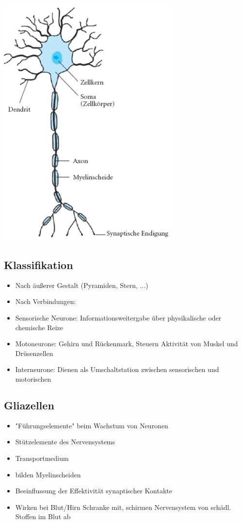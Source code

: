 \documentclass[a4paper,10pt,oneside]{article}
\begin{document}
\includegraphics[scale=0.65]{Grafiken/neuron.png}


\subsection{Klassifikation}
\begin{itemize}
	\item Nach äußerer Gestalt (Pyramiden, Stern, ...)
	\item Nach Verbindungen:
	\item Sensorische Neurone: Informationsweitergabe über physikalische oder chemische Reize
	\item Motoneurone: Gehirn und Rückenmark, Steuern Aktivität von Muskel und Drüsenzellen
	\item Interneurone: Dienen als Umschaltstation zwischen sensorischen und motorischen
\end{itemize}


\subsection{Gliazellen}
\begin{itemize}
	\item "Führungselemente" beim Wachstum von Neuronen
	\item Stützelemente des Nervensystems
	\item Transportmedium 
	\item bilden Myelinscheiden
	\item Beeinflussung der Effektivität synaptischer Kontakte
	\item Wirken bei Blut/Hirn Schranke mit, schirmen Nervensystem von schädl. Stoffen im Blut ab
\end{itemize}
\end{document}
